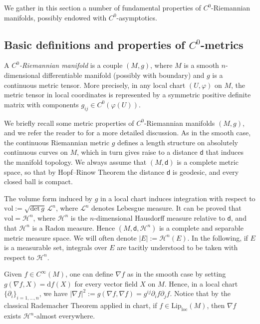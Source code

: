 \documentclass[a4paper,12pt,reqno]{amsart}
\numberwithin{equation}{section}
\theoremstyle{plain}
\theoremstyle{definition}
\theoremstyle{remark}
\newcommand{\haus}{\mathcal{H}}
\newcommand{\dist}{\mathsf{d}}
\begin{document}
{We gather in this section a number of fundamental properties of $C^0$-Riemannian manifolds, possibly endowed with $C^0$-asymptotics. 

\subsection{Basic definitions and properties of $C^0$-metrics}

\begin{definition}
A \textit{$C^0$-Riemannian manifold} is a couple $(M,g)$, where $M$ is a smooth $n$-dimensional differentiable manifold (possibly with boundary) and $g$ is a continuous metric tensor. More precisely, in any local chart $(U,\varphi)$ on $M$, the metric tensor in local coordinates is represented by a symmetric positive definite matrix with components $g_{ij} \in C^0(\varphi(U))$.
\end{definition}

We briefly recall some metric properties of $C^0$-Riemannian manifolds $(M,g)$, and we refer the reader to \cite{burtscher-continuousmetrics, petrunin-metricgeometrytwolectures} for a more detailed discussion. As in the smooth case, the continuous Riemannian metric $g$ defines a length structure on absolutely continuous curves on $M$, which in turn gives raise to a distance $\dist$ that induces the manifold topology. We always assume that $(M,\dist)$ is a complete metric space, so that by Hopf--Rinow Theorem the distance $\dist$ is geodesic, and every closed ball is compact. 

The volume form induced by $g$ in a local chart induces integration with respect to $\mathrm{vol}:=\sqrt{\mathrm{det}\,g} \,\mathcal{L}^n$, where $\mathcal{L}^n$ denotes Lebesgue measure. It can be proved that $\mathrm{vol}=\mathcal{H}^n$, where $\mathcal{H}^n$ is the $n$-dimensional Hausdorff measure relative to $\dist$, and that $\mathcal{H}^n$ is a Radon measure. Hence $(M,\dist,\mathcal{H}^n)$ is a complete and separable metric measure space. We will often denote $|E|:=\mathcal{H}^n(E)$. In the following, if $E$ is a measurable set, integrals over $E$ are tacitly understood to be taken with respect to $\haus^n$.

Given $f\in C^{\infty}(M)$, one can define $\nabla f$ as in the smooth case by setting $g(\nabla f,X)=\mathrm{d}f(X)$ for every vector field $X$ on $M$. Hence, in a local chart $\{\partial_i\}_{i=1,\ldots,n}$, we have $|\nabla f|^2:=g(\nabla f,\nabla f)=g^{ij}\partial_i f\partial_j f$. Notice that by the classical Rademacher Theorem applied in chart, if $f\in \mathrm{Lip}_{\mathrm{loc}}(M)$, then $\nabla f$ exists $\mathcal{H}^n$-almost everywhere.


}
\end{document}
